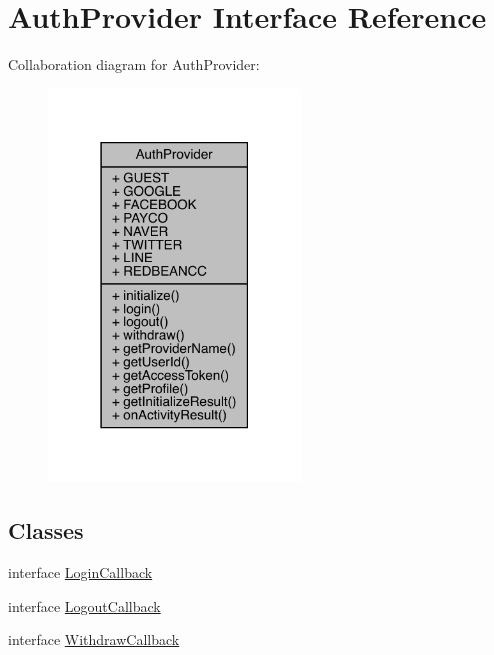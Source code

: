 \hypertarget{interfacecom_1_1toast_1_1android_1_1gamebase_1_1base_1_1auth_1_1_auth_provider}{}\section{Auth\+Provider Interface Reference}
\label{interfacecom_1_1toast_1_1android_1_1gamebase_1_1base_1_1auth_1_1_auth_provider}


Collaboration diagram for Auth\+Provider\+:
\nopagebreak
\begin{figure}[H]
\begin{center}
\leavevmode
\includegraphics[width=190pt]{interfacecom_1_1toast_1_1android_1_1gamebase_1_1base_1_1auth_1_1_auth_provider__coll__graph}
\end{center}
\end{figure}
\subsection*{Classes}
\begin{DoxyCompactItemize}
\item 
interface \hyperlink{interfacecom_1_1toast_1_1android_1_1gamebase_1_1base_1_1auth_1_1_auth_provider_1_1_login_callback}{Login\+Callback}
\item 
interface \hyperlink{interfacecom_1_1toast_1_1android_1_1gamebase_1_1base_1_1auth_1_1_auth_provider_1_1_logout_callback}{Logout\+Callback}
\item 
interface \hyperlink{interfacecom_1_1toast_1_1android_1_1gamebase_1_1base_1_1auth_1_1_auth_provider_1_1_withdraw_callback}{Withdraw\+Callback}
\end{DoxyCompactItemize}
